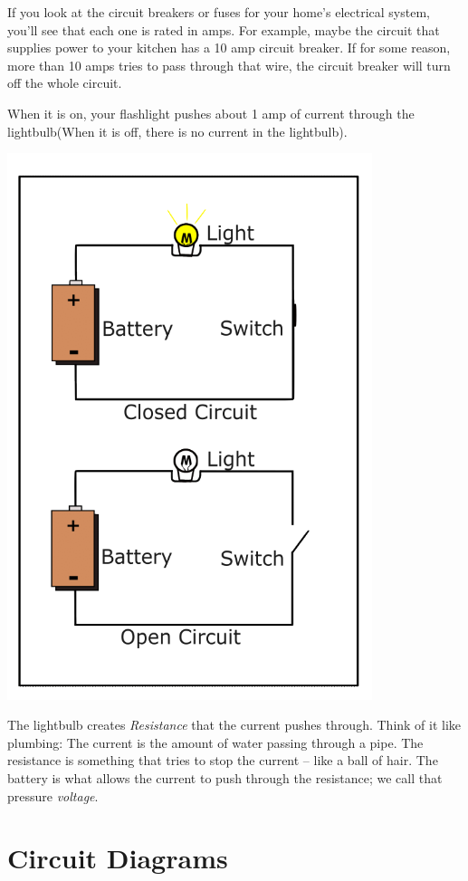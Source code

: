 If you look at the circuit breakers or fuses for your home's
electrical system, you'll see that each one is rated in amps.  For
example, maybe the circuit that supplies power to your kitchen has a 10
amp circuit breaker. If for some reason, more than 10 amps tries to
pass through that wire, the circuit breaker will turn off the whole
circuit.

When it is on, your flashlight pushes about 1 amp of current
through the lightbulb(When it is off, there is no current in the
lightbulb).

\includegraphics[width=0.8\textwidth]{Circuit_OnOff.png}

The lightbulb creates \textit{Resistance} that the current pushes
through. Think of it like plumbing: The current is the amount of water
passing through a pipe. The resistance is something that tries to stop
the current -- like a ball of hair. The battery is what allows
 the current to push through the resistance; we call that
pressure \textit{voltage}.

\section{Circuit Diagrams}

